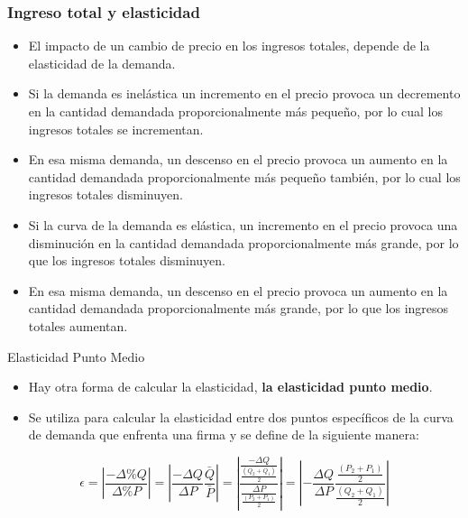 \documentclass{beamer}
\begin{document}
\begin{frame}
\frametitle{Ingreso total y elasticidad}
\begin{itemize}
    \item El impacto de un cambio de precio en los ingresos totales, depende de la elasticidad de la demanda.
    \item Si la demanda es inelástica un incremento en el precio provoca un decremento en la cantidad demandada proporcionalmente más pequeño, por lo cual los ingresos totales se incrementan.
    \item En esa misma demanda, un descenso en el precio provoca un aumento en la cantidad demandada proporcionalmente más pequeño también, por lo cual los ingresos totales disminuyen.
    \item Si la curva de la demanda es elástica, un incremento en el precio provoca una disminución en la cantidad demandada proporcionalmente más grande, por lo que los ingresos totales disminuyen.
    \item En esa misma demanda, un descenso en el precio provoca un aumento en la cantidad demandada proporcionalmente más grande, por lo que los ingresos totales aumentan.
\end{itemize}
\end{frame}

\begin{frame}{Elasticidad Punto Medio}
  \begin{itemize}
      \item Hay otra forma de calcular la elasticidad, \textbf{la elasticidad punto medio}.
      \item Se utiliza para calcular la elasticidad entre dos puntos
      específicos de la curva de demanda que enfrenta una firma y se define
      de la siguiente manera:
    \end{itemize}
    \begin{equation*}
      \epsilon = \left|\frac{- \Delta \% Q}{\Delta \% P}\right|= \left|\frac{- \Delta Q}{\Delta P} \frac{\bar Q}{\bar P}\right| = \left|\frac{\frac{- \Delta Q}{\frac{(Q_2+Q_1)}{2}}}{\frac{\Delta P}{\frac{(P_2+P_1)}{2}}}\right| = \left|-\frac{\Delta Q}{\Delta P} \frac{\frac{(P_2+P_1)}{2}}{\frac{(Q_2+Q_1)}{2}}\right|
    \end{equation*}
\end{frame}
\end{document}
